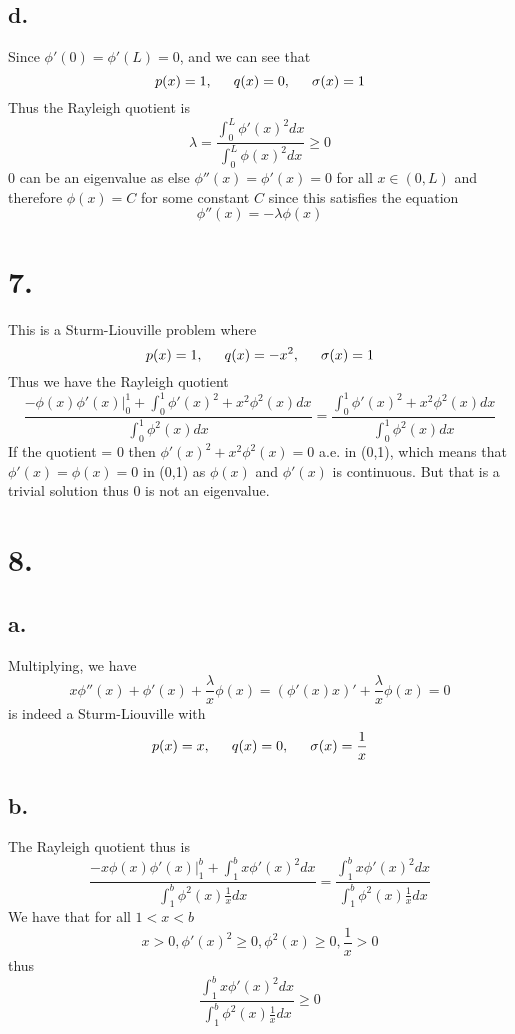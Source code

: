 \documentclass[11pt]{article}
\theoremstyle{mystyle}
\theoremstyle{definition}
\begin{document}
\subsection*{d.}
Since $\phi'(0) = \phi'(L) = 0$, and we can see that 
\[
  p(x) = 1, \indent q(x) = 0, \indent \sigma(x) = 1
\]
Thus the Rayleigh quotient is 
\[
  \lambda = \displaystyle\frac{\int_0^L \phi'(x)^2 dx}{\int_0^L \phi(x)^2 dx} \ge 0
\]
$0$ can be an eigenvalue as else $\phi''(x) = \phi'(x) = 0$ for all $x \in (0,L)$ and therefore $\phi(x) = C$ for some constant $C$ since this satisfies the equation 
\[
  \phi''(x) = - \lambda \phi(x)
\]
\newpage
\section*{7.}
This is a Sturm-Liouville problem where
\[
  p(x) = 1, \indent q(x) = -x^2, \indent \sigma(x) = 1
\]
Thus we have the Rayleigh quotient
\[
  \displaystyle\frac{- \phi(x) \phi'(x) |^1_0 + \int_0^1 \phi'(x)^2 +x^2 \phi^2(x) dx}{\int_0^1 \phi^2(x) dx} = \displaystyle\frac{\int_0^1 \phi'(x)^2 + x^2 \phi^2(x)dx}{\int_0^1 \phi^2(x) dx}
\]
If the quotient = 0 then $\phi'(x)^2 + x^2 \phi^2(x) = 0$ a.e. in (0,1), which means that $\phi'(x) = \phi(x) = 0$ in (0,1) as $\phi(x)$ and $\phi'(x)$ is continuous. But that is a trivial solution thus 0 is not an eigenvalue.
\newpage
\section*{8.}
\subsection*{a.}
Multiplying, we have 
\[
  x \phi''(x) + \phi'(x) + \displaystyle\frac{\lambda}{x}\phi(x) = (\phi'(x)x)' + \displaystyle\frac{\lambda}{x}\phi(x) = 0
\]
is indeed a Sturm-Liouville with 
\[
  p(x) = x, \indent q(x) = 0, \indent \sigma(x) = \displaystyle\frac{1}{x}
\]
\subsection*{b.}
The Rayleigh quotient thus is 
\[ 
  \displaystyle\frac{-x \phi(x) \phi'(x) |^b_1 + \int_1^b x\phi'(x)^2 dx}{\int_1^b \phi^2(x) \displaystyle\frac{1}{x} dx} = \displaystyle\frac{\int_1^b x\phi'(x)^2 dx}{\int_1^b \phi^2(x)\displaystyle\frac{1}{x} dx}
\]
We have that for all $1<x<b$
\[
  x > 0, \phi'(x)^2 \ge 0, \phi^2(x) \ge 0, \displaystyle\frac{1}{x} > 0
\]
thus 
\[
 \displaystyle\frac{\int_1^b x\phi'(x)^2 dx}{\int_1^b \phi^2(x)\displaystyle\frac{1}{x} dx} \ge 0 
\]
\end{document}
